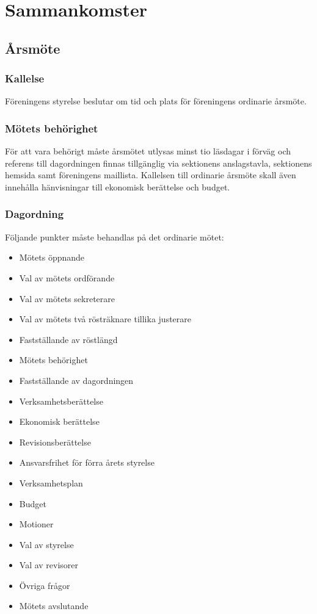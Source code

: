 \section{Sammankomster}

\subsection{Årsmöte}

\subsubsection{Kallelse}
Föreningens styrelse beslutar om tid och plats för föreningens ordinarie årsmöte.

\subsubsection{Mötets behörighet} \label{sec:mötets-behörighet}
För att vara behörigt måste årsmötet utlysas minst tio läsdagar i förväg och referens till dagordningen finnas tillgänglig via sektionens anslagstavla, sektionens hemsida samt föreningens maillista. Kallelsen till ordinarie årsmöte skall även innehålla hänvisningar till ekonomisk berättelse och budget.

\subsubsection{Dagordning}
Följande punkter måste behandlas på det ordinarie mötet:
\begin{itemize}
    \item Mötets öppnande
    \item Val av mötets ordförande
    \item Val av mötets sekreterare
    \item Val av mötets två rösträknare tillika justerare
    \item Fastställande av röstlängd
    \item Mötets behörighet
    \item Fastställande av dagordningen
    \item Verksamhetsberättelse
    \item Ekonomisk berättelse
    \item Revisionsberättelse
    \item Ansvarsfrihet för förra årets styrelse
    \item Verksamhetsplan
    \item Budget
    \item Motioner
    \item Val av styrelse
    \item Val av revisorer
    \item Övriga frågor
    \item Mötets avslutande
\end{itemize}

